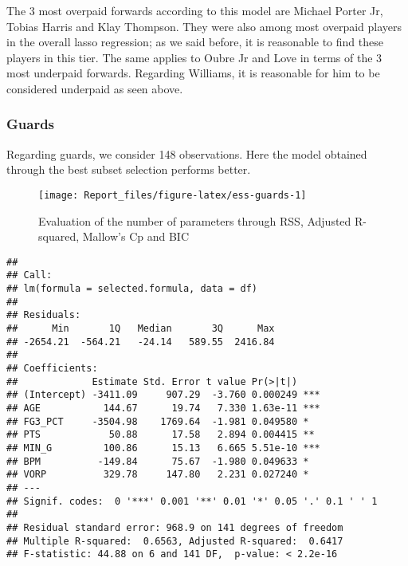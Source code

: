 \documentclass[
]{article}
\begin{document}
The 3 most overpaid forwards according to this model are Michael Porter
Jr, Tobias Harris and Klay Thompson. They were also among most overpaid
players in the overall lasso regression; as we said before, it is
reasonable to find these players in this tier. The same applies to Oubre
Jr and Love in terms of the 3 most underpaid forwards. Regarding
Williams, it is reasonable for him to be considered underpaid as seen
above.

\hypertarget{guards}{%
\subsubsection{Guards}\label{guards}}

Regarding guards, we consider 148 observations. Here the model obtained
through the best subset selection performs better.

\begin{figure}

{\centering \texttt{[image: Report\_files/figure-latex/ess-guards-1]} 

}

\caption{Evaluation of the number of parameters through RSS, Adjusted R-squared, Mallow's Cp and BIC \label{fig:ess-guards}}\label{fig:ess-guards}
\end{figure}

\begin{verbatim}
## 
## Call:
## lm(formula = selected.formula, data = df)
## 
## Residuals:
##      Min       1Q   Median       3Q      Max 
## -2654.21  -564.21   -24.14   589.55  2416.84 
## 
## Coefficients:
##             Estimate Std. Error t value Pr(>|t|)    
## (Intercept) -3411.09     907.29  -3.760 0.000249 ***
## AGE           144.67      19.74   7.330 1.63e-11 ***
## FG3_PCT     -3504.98    1769.64  -1.981 0.049580 *  
## PTS            50.88      17.58   2.894 0.004415 ** 
## MIN_G         100.86      15.13   6.665 5.51e-10 ***
## BPM          -149.84      75.67  -1.980 0.049633 *  
## VORP          329.78     147.80   2.231 0.027240 *  
## ---
## Signif. codes:  0 '***' 0.001 '**' 0.01 '*' 0.05 '.' 0.1 ' ' 1
## 
## Residual standard error: 968.9 on 141 degrees of freedom
## Multiple R-squared:  0.6563, Adjusted R-squared:  0.6417 
## F-statistic: 44.88 on 6 and 141 DF,  p-value: < 2.2e-16
\end{verbatim}
\end{document}
